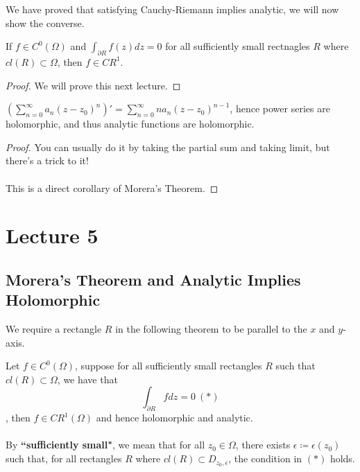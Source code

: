 \documentclass{article}
\begin{document}
We have proved that satisfying Cauchy-Riemann implies analytic, we will now show the converse.

\begin{theorem}
If $f \in C^0(\Omega)$ and $\int_{\partial R} f(z) dz = 0$ for all sufficiently small rectnagles $R$ where $cl(R) \subset \Omega$, then $f \in CR^1$.
\end{theorem}

\begin{proof}
We will prove this next lecture.
\end{proof}

\begin{theorem}
$(\sum_{n = 0}^\infty a_n (z - z_0)^n)' = \sum_{n = 0}^\infty n a_n (z - z_0)^{n-1}$, hence power series are holomorphic, and thus analytic functions are holomorphic.
\end{theorem}

\begin{proof}
You can usually do it by taking the partial sum and taking limit, but there's a trick to it!\\\\
This is a direct corollary of Morera's Theorem.
\end{proof}

\newpage
\section{Lecture 5}

\subsection{Morera's Theorem and Analytic Implies Holomorphic}

\noindent We require a rectangle $R$ in the following theorem to be parallel to the $x$ and $y$-axis.

\begin{theorem}
    Let $f \in C^0(\Omega)$, suppose for all sufficiently small rectangles $R$ such that $cl(R) \subset \Omega$, we have that
    \[\int_{\partial R} f dz = 0\ (*)\]
    , then $f \in CR^1(\Omega)$ and hence holomorphic and analytic.\\\\
    By \textbf{``sufficiently small"}, we mean that for all $z_0 \in \Omega$, there exists $\epsilon \coloneqq \epsilon(z_0)$ such that, for all rectangles $R$ where $cl(R) \subset D_{z_0, \epsilon}$, the condition in $(*)$ holds.
\end{theorem}
\end{document}
